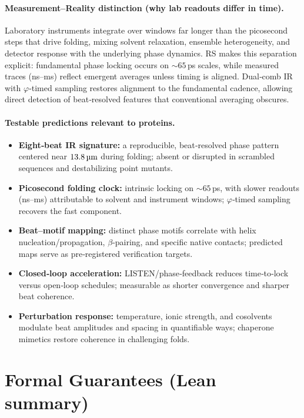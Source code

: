 \documentclass[12pt,a4paper]{article}
\begin{document}
\paragraph{Measurement–Reality distinction (why lab readouts differ in time).}
Laboratory instruments integrate over windows far longer than the picosecond steps that drive folding, mixing solvent relaxation, ensemble heterogeneity, and detector response with the underlying phase dynamics. RS makes this separation explicit: fundamental phase locking occurs on $\sim 65$\,ps scales, while measured traces (ns–ms) reflect emergent averages unless timing is aligned. Dual‑comb IR with $\varphi$‑timed sampling restores alignment to the fundamental cadence, allowing direct detection of beat‑resolved features that conventional averaging obscures.

\paragraph{Testable predictions relevant to proteins.}
\begin{itemize}
  \item \textbf{Eight‑beat IR signature:} a reproducible, beat‑resolved phase pattern centered near $13.8\,\text{\textmu m}$ during folding; absent or disrupted in scrambled sequences and destabilizing point mutants.
  \item \textbf{Picosecond folding clock:} intrinsic locking on $\sim 65$\,ps, with slower readouts (ns–ms) attributable to solvent and instrument windows; $\varphi$‑timed sampling recovers the fast component.
  \item \textbf{Beat–motif mapping:} distinct phase motifs correlate with helix nucleation/propagation, $\beta$‑pairing, and specific native contacts; predicted maps serve as pre‑registered verification targets.
  \item \textbf{Closed‑loop acceleration:} LISTEN/phase‑feedback reduces time‑to‑lock versus open‑loop schedules; measurable as shorter convergence and sharper beat coherence.
  \item \textbf{Perturbation response:} temperature, ionic strength, and cosolvents modulate beat amplitudes and spacing in quantifiable ways; chaperone mimetics restore coherence in challenging folds.
\end{itemize}

\section{Formal Guarantees (Lean summary)}
\end{document}
